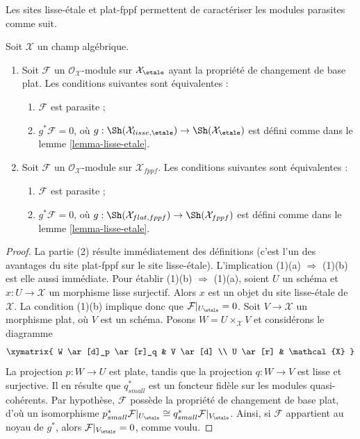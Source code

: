 \noindent
Les sites lisse-étale et plat-fppf permettent de caractériser
les modules parasites comme suit.

\begin{lemma}
\label{lemma-parasitic-in-terms-flat-fppf}
Soit $\mathcal{X}$ un champ algébrique.
\begin{enumerate}
\item Soit $\mathcal{F}$ un $\mathcal{O}_\mathcal{X}$-module
sur $\mathcal{X}_\etale$ ayant la propriété de changement de base plat.
Les conditions suivantes sont équivalentes :
\begin{enumerate}
\item $\mathcal{F}$ est parasite ;
\item $g^*\mathcal{F} = 0$, où
$g : \Sh(\mathcal{X}_{lisse,\etale}) \to
\Sh(\mathcal{X}_\etale)$ est défini comme dans le lemme \ref{lemma-lisse-etale}.
\end{enumerate}
\item Soit $\mathcal{F}$ un $\mathcal{O}_\mathcal{X}$-module sur
$\mathcal{X}_{fppf}$. Les conditions suivantes sont équivalentes :
\begin{enumerate}
\item $\mathcal{F}$ est parasite ;
\item $g^*\mathcal{F} = 0$, où
$g :  \Sh(\mathcal{X}_{flat,fppf}) \to \Sh(\mathcal{X}_{fppf})$
est défini comme dans le lemme \ref{lemma-lisse-etale}.
\end{enumerate}
\end{enumerate}
\end{lemma}

\begin{proof}
La partie (2) résulte immédiatement des définitions (c'est l'un des avantages
du site plat-fppf sur le site lisse-étale). L'implication
(1)(a) $\Rightarrow$ (1)(b) est elle aussi immédiate. Pour établir (1)(b)
$\Rightarrow$ (1)(a), soient $U$ un schéma et $x : U \to \mathcal{X}$
un morphisme lisse surjectif. Alors $x$ est un objet du
site lisse-étale de $\mathcal{X}$. La condition (1)(b)
implique donc que $\mathcal{F}|_{U_\etale} = 0$. Soit $V \to \mathcal{X}$
un morphisme plat, où $V$ est un schéma. Posons $W = U \times_\mathcal{X} V$
et considérons le diagramme
$$
\xymatrix{
W \ar[d]_p \ar[r]_q & V \ar[d] \\
U \ar[r] & \mathcal{X}
}
$$
La projection $p : W \to U$ est plate, tandis que la projection
$q : W \to V$ est lisse et surjective. Il en résulte que $q_{small}^*$
est un foncteur fidèle sur les modules quasi-cohérents. Par hypothèse,
$\mathcal{F}$ possède la propriété de changement de base plat, d'où un isomorphisme
$p_{small}^*\mathcal{F}|_{U_\etale} \cong
q_{small}^*\mathcal{F}|_{V_\etale}$. Ainsi, si $\mathcal{F}$
appartient au noyau de $g^*$, alors $\mathcal{F}|_{V_\etale} = 0$,
comme voulu.
\end{proof}






